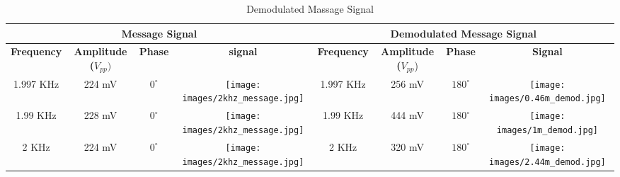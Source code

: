\begin{sidewaystable}
    \caption{Demodulated Massage Signal}
    \centering
    \begin{tabular}{c|c|c|c|c|c|c|c}
        \hline
        \multicolumn{4}{c}{Message Signal} \vline                                                                                                       & \multicolumn{4}{c}{Demodulated Message Signal} \\
        \hline
        \textbf{Frequency}  & \textbf{Amplitude ($V_{pp})$}     & \textbf{Phase}    & \textbf{signal}                                                   & \textbf{Frequency}    & \textbf{Amplitude ($V_{pp}$}) & \textbf{Phase}    & \textbf{Signal} \\
        \hline
        1.997 KHz           & 224 mV                            & $0^\circ$         & \texttt{[image: images/2khz\_message.jpg]}    & 1.997 KHz             & 256 mV                        &  $180^\circ$      & \texttt{[image: images/0.46m\_demod.jpg]} \\
        \hline
        1.99 KHz            & 228 mV                            &$0^\circ$          & \texttt{[image: images/2khz\_message.jpg]}    & 1.99 KHz              & 444 mV                        & $180^\circ$       & \texttt{[image: images/1m\_demod.jpg]} \\
        \hline
        2 KHz               & 224 mV                            & $0^\circ$         & \texttt{[image: images/2khz\_message.jpg]}    & 2 KHz                 & 320 mV                        & $180^\circ$       & \texttt{[image: images/2.44m\_demod.jpg]} \\
    \end{tabular}
\end{sidewaystable}